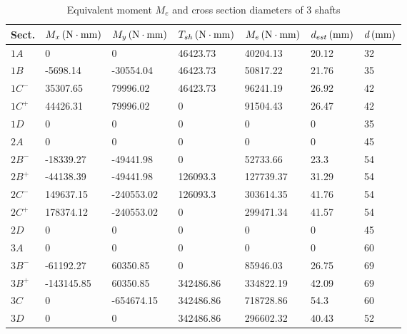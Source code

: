 \begin{table}[ht]
	\centering
	\caption{Equivalent moment $ M_e $ and cross section diameters of 3 shafts}
	\begin{tabular}{lllllll}\toprule
		Sect. & $ M_x\, (\mathrm{N\cdot mm}) $  & $ M_y\, (\mathrm{N\cdot mm}) $ & $ T_{sh}\, (\mathrm{N\cdot mm}) $ & $ M_e\, (\mathrm{N\cdot mm}) $ & $ d_{est}\, (\mathrm{mm}) $ & $ d\, (\mathrm{mm}) $ \\ \midrule
		$ 1A $		&	0			&	0			&	46423.73	& 40204.13	&	20.12	& 32 \\
		$ 1B $		&	-5698.14	&	-30554.04	&	46423.73	& 50817.22	&	21.76	& 35 \\
		$ 1C^- $	&	35307.65	&	79996.02	&	46423.73	& 96241.19	&	26.92	& 42 \\
		$ 1C^+ $	&	44426.31	&	79996.02	&	0			& 91504.43	&	26.47	& 42 \\
		$ 1D $		&	0			&	0			&	0			& 0			&	0		& 35 \\
		$ 2A $		&	0			&	0			&	0			& 0			&	0		& 45 \\
		$ 2B^- $	&	-18339.27	&	-49441.98	&	0			& 52733.66	&	23.3	& 54 \\
		$ 2B^+ $	&	-44138.39	&	-49441.98	&	126093.3	& 127739.37	&	31.29	& 54 \\
		$ 2C^- $	&	149637.15	&	-240553.02	&	126093.3	& 303614.35	&	41.76	& 54 \\
		$ 2C^+ $	&	178374.12	&	-240553.02	&	0			& 299471.34	&	41.57	& 54 \\
		$ 2D $		&	0			&	0			&	0			& 0			&	0		& 45 \\
		$ 3A $		&	0			&	0			&	0			& 0			&	0		& 60 \\
		$ 3B^- $	&	-61192.27	&	60350.85	&	0			& 85946.03	&	26.75	& 69 \\
		$ 3B^+ $	&	-143145.85	&	60350.85	&	342486.86	& 334822.19	&	42.09	& 69 \\
		$ 3C $		&	0			&	-654674.15	&	342486.86	& 718728.86	&	54.3	& 60 \\
		$ 3D $		&	0			&	0			&	342486.86	& 296602.32	&	40.43	& 52 \\
		\bottomrule
	\end{tabular}
	\label{dia_sh}
\end{table}

